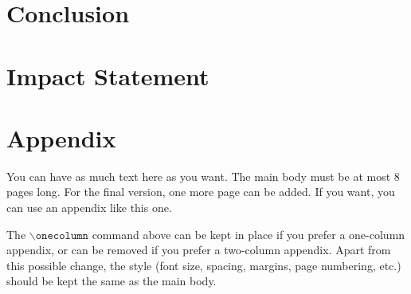 \documentclass{article}
\theoremstyle{plain}
\theoremstyle{definition}
\theoremstyle{remark}
\begin{document}
\section{Conclusion}
\label{conclusion}




\section*{Impact Statement}
\label{Imapact Statement}

\nocite{*}




\newpage
\appendix
\onecolumn
\section{Appendix}

You can have as much text here as you want. The main body must be at most $8$ pages long.
For the final version, one more page can be added.
If you want, you can use an appendix like this one.  

The $\mathtt{\backslash onecolumn}$ command above can be kept in place if you prefer a one-column appendix, or can be removed if you prefer a two-column appendix.  Apart from this possible change, the style (font size, spacing, margins, page numbering, etc.) should be kept the same as the main body.
\end{document}
